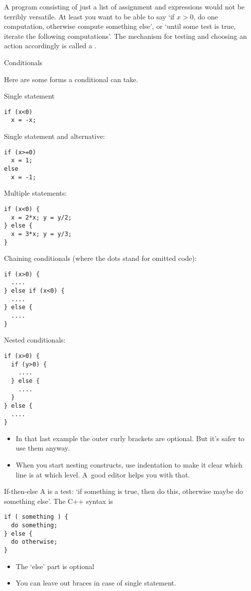 
A program consisting of just a list of assignment and expressions
would not be terribly versatile. At least you want to be able to say
`if $x>0$, do one computation, otherwise compute something else', or `until some
test is true, iterate the following computations'. The mechanism for
testing and choosing an action accordingly is called a
.

 {Conditionals}
\label{sec:if}

Here are some forms a conditional can take.

Single statement
\begin{verbatim}
if (x<0)
  x = -x;
\end{verbatim}
Single statement and alternative:
\begin{verbatim}
if (x>=0)
  x = 1;
else
  x = -1;
\end{verbatim}
Multiple statements:
\begin{verbatim}
if (x<0) {
  x = 2*x; y = y/2;
} else {
  x = 3*x; y = y/3;
}
\end{verbatim}
Chaining conditionals (where the dots stand for omitted code):
\begin{verbatim}
if (x>0) {
  ....
} else if (x<0) {
  ....
} else {
  ....
}
\end{verbatim}
Nested conditionals:
\begin{verbatim}
if (x>0) {
  if (y>0) {
    ....
  } else {
    ....
  }
} else {
  ....
}
\end{verbatim}
\begin{itemize}
\item
  In that last example the outer curly brackets are optional. But it's
  safer to use them anyway.
\item When you start nesting constructs, use indentation to make it
  clear which line is at which level. A~good editor helps you with that.
\end{itemize}

\begin{slide}{If-then-else}
  \label{sl:ifthenelse}
  A  is a test: `if something is true, then do
  this, otherwise maybe do something else'. The C++ syntax is
\begin{verbatim}
if ( something ) {
  do something;
} else {
  do otherwise;
}
\end{verbatim}
\begin{itemize}
\item The `else' part is optional
\item You can leave out braces in case of single statement.
\end{itemize}
\end{slide}

